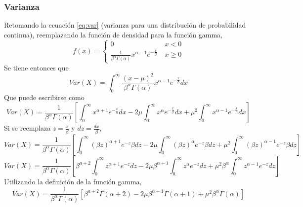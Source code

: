 \documentclass[12pt]{article}
\begin{document}
        	\subsubsection{Varianza}
          Retomando la ecuación \ref{eq:var} (varianza para una distribución de probabilidad continua), reemplazando la función de densidad para la función gamma,
          \begin{equation}
            f\left( x \right)=\left\{\begin{array}{cc} 0 & x<0 \\ \frac{1}{\beta ^{\alpha }\Gamma\left( \alpha  \right)}x^{\alpha -1}e^{-\frac{x}{\beta }}\;  & x\geq 0 \end{array}\right.
          \end{equation}
          Se tiene entonces que
          \begin{equation*}
            Var\left( X \right)=\int_{0}^{\infty }{\frac{\left( x-\mu  \right)^{2}}{\beta^{\alpha }\Gamma\left( \alpha  \right)}x^{\alpha -1}e^{-\frac{x}{\beta }}dx}
          \end{equation*}
          Que puede escribirse como
          \begin{equation*}
            Var\left( X \right)=\frac{1}{\beta ^{\alpha }\Gamma\left( \alpha  \right)}\left[ \int_{0}^{\infty }{x^{\alpha +1}e^{-\frac{x}{b}}dx}-2\mu \int_{0.}^{\infty }{x^{\alpha }e^{-\frac{x}{\beta }}dx}+\mu ^{2}\int_{0}^{\infty }{x^{\alpha -1}e^{-\frac{x}{\beta }}dx} \right]
          \end{equation*}
         \newpage Si se reemplaza $z=\frac{x}{\beta}$ y $dz=\frac{dx}{\beta}$,
          \begin{equation*}
            Var\left( X \right)=\frac{1}{\beta ^{\alpha }\Gamma\left( \alpha  \right)}\left[ \int_{0}^{\infty }{\left( \beta z \right)^{\alpha +1}e^{-z}\beta dz}-2\mu \int_{0.}^{\infty }{\left( \beta z \right)^{\alpha }e^{-z}\beta dz}+\mu ^{2}\int_{0}^{\infty }{\left( \beta z \right)^{\alpha -1}e^{-z}\beta dz} \right]
          \end{equation*}
          \begin{equation*}
            Var\left( X \right)=\frac{1}{\beta ^{\alpha }\Gamma\left( \alpha  \right)}\left[ \beta ^{a+2}\int_{0}^{\infty }{z^{\alpha +1}e^{-z}dz}-2\mu \beta ^{\alpha +1}\int_{0.}^{\infty }{z^{\alpha }e^{-z}dz}+\mu ^{2}\beta ^{\alpha }\int_{0}^{\infty }{z^{\alpha -1}e^{-z}dz} \right]
          \end{equation*}
          Utilizando la definición de la función gamma,
          \begin{equation*}
            Var\left( X \right)=\frac{1}{\beta ^{\alpha }\Gamma\left( \alpha  \right)}\left[ \beta ^{a+2}\Gamma\left( \alpha +2 \right)-2\mu \beta ^{\alpha +1}\Gamma\left( \alpha +1 \right)+\mu ^{2}\beta ^{\alpha }\Gamma\left( \alpha  \right) \right]
          \end{equation*}
\end{document}
